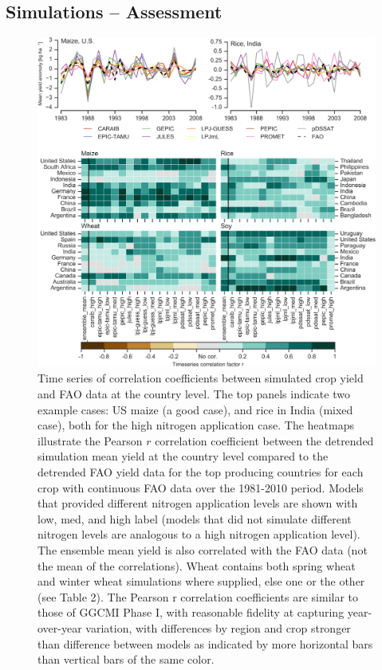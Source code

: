 \documentclass[esd, manuscript]{copernicus} %
\begin{document}
\subsection{Simulations -- Assessment}
\label{A:1}

\begin{figure}[t]
    \centering
    \includegraphics[width=15cm]{figures/Agformet_validation.png}
    \caption{Time series of correlation coefficients between simulated crop yield and FAO data \citep{FAOSTAT} at the country level. The top panels indicate two example cases: US maize (a good case), and rice in India (mixed case), both for the high nitrogen application case. The heatmaps illustrate the Pearson $r$ correlation coefficient between the detrended simulation mean yield at the country level compared to the detrended FAO yield data for the top producing countries for each crop with continuous FAO data over the 1981-2010 period. Models that provided different nitrogen application levels are shown with low, med, and high label (models that did not simulate different nitrogen levels are analogous to a high nitrogen application level). The ensemble mean yield is also correlated with the FAO data (not the mean of the correlations). Wheat contains both spring wheat and winter wheat simulations where supplied, else one or the other (see Table 2). The Pearson r correlation coefficients are similar to those of GGCMI Phase I, with reasonable fidelity at capturing year-over-year variation, with differences by region and crop stronger than difference between models as indicated by more horizontal bars than vertical bars of the same color.}
    \label{fig:simulation_val}
\end{figure}
\end{document}
